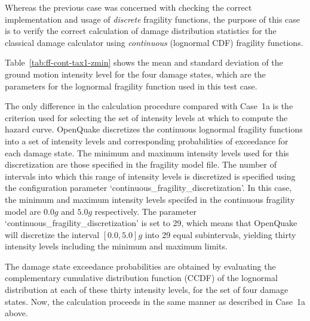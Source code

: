 Whereas the previous case was concerned with checking the correct implementation and usage of \emph{discrete} fragility functions, the purpose of this case is to verify the correct calculation of damage distribution statistics for the classical damage calculator using \emph{continuous} (lognormal CDF) fragility functions.

Table~\ref{tab:ff-cont-tax1-zmin} shows the mean and standard deviation of the ground motion intensity level for the four damage states, which are the parameters for the lognormal fragility function used in this test case.

The only difference in the calculation procedure compared with Case~1a is the criterion used for selecting the set of intensity levels at which to compute the hazard curve. OpenQuake discretizes the continuous lognormal fragility functions into a set of intensity levels and corresponding probabilities of exceedance for each damage state. The minimum and maximum intensity levels used for this discretization are those specified in the fragility model file. The number of intervals into which this range of intensity levels is discretized is specified using the configuration parameter `continuous\_fragility\_discretization'. In this case, the minimum and maximum intensity levels specifed in the continuous fragility model are $0.0 g$ and $5.0 g$ respectively. The parameter `continuous\_fragility\_discretization' is set to 29, which means that OpenQuake will discretize the interval $[0.0, 5.0]g$ into 29 equal subintervals, yielding thirty intensity levels including the minimum and maximum limits.

The damage state exceedance probabilities are obtained by evaluating the complementary cumulative distribution function (CCDF) of the lognormal distribution at each of these thirty intensity levels, for the set of four damage states. Now, the calculation proceeds in the same manner as described in Case~1a above.